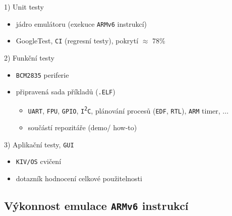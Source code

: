 \documentclass[compress]{beamer}
\begin{document}
\begin{frame}
	\begin{block}{1) Unit testy}
		\begin{itemize}
			\item jádro emulátoru (exekuce \texttt{ARMv6} instrukcí)
			\item GoogleTest, \texttt{CI} (regresní testy), pokrytí $\approx$ 78\%
		\end{itemize}
	\end{block}
	\begin{block}{2) Funkční testy}
		\begin{itemize}
			\item \texttt{BCM2835} periferie
			\item připravená sada příkladů (\texttt{.ELF})
			\begin{itemize}
				\item \texttt{UART}, \texttt{FPU}, \texttt{GPIO}, \texttt{I\textsuperscript{2}C}, plánování procesů (\texttt{EDF}, \texttt{RTL}), \texttt{ARM} timer, ...
				\item součástí repozitáře (demo/ how-to)
			\end{itemize}
		\end{itemize}
	\end{block}
	\begin{block}{3) Aplikační testy, \texttt{GUI}}
		\begin{itemize}
			\item \texttt{KIV/OS} cvičení
			\item dotazník hodnocení celkové použitelnosti
		\end{itemize}
	\end{block}
\end{frame}

\subsection{Výkonnost emulace \texttt{ARMv6} instrukcí}
\end{document}
